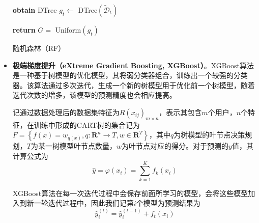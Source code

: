 \documentclass{MathorCupmodeling}
\begin{document}
\begin{itemize}
{\begin{algorithm}[H]
{			\textbf{obtain} DTree $g_t\leftarrow$ DTree$\left(\tilde{\mathcal{D}}_t\right)$\
	
			\textbf{return} $G=$ Uniform$\left(g_t\right)$
			}
			
			\caption{随机森林（RF）}
		\end{algorithm}}

		\item \textbf{极端梯度提升（eXtreme Gradient Boosting, XGBoost）}。XGBoost算法是一种基于树模型的优化模型，其将弱分类器组合，训练出一个较强的分类器。该算法通过多次迭代，生成一个新的树模型用于优化前一个树模型，随着迭代次数的增多，该模型的预测精度也会相应提高\textcolor{blue}{\cite{pxgboost1}}。

		记通过数据处理后的数据集特征为$R\left(x_{ij}\right)_{m\times n}$，表示其包含$m$个用户，$n$个特征，在训练中形成的CART树的集合记为$F=\left\{f\left(x\right)=w_{q\left(x\right)},q:\mathbf{R}^n\to T,w\in \mathbf{R}^T\right\}$，其中$q$为树模型的叶节点决策规划，$T$为某一树模型叶节点数量，$w$为叶节点对应的得分\textcolor{blue}{\cite{pxgboost2}}。对于预测的$y$值，其计算公式为
		\begin{equation}
			\hat{y}=\varphi \left( x_i \right) =\sum\limits_{k=1}^K{f_k\left( x_i \right)} \label{fXGBoostypre}
		\end{equation}
	
		XGBoost算法在每一次迭代过程中会保存前面所学习的模型，会将这些模型加入到新一轮迭代过程中，因此我们记第$i$个模型为预测结果为
		\begin{equation}
			\hat{y}_{i}^{\left(t\right)}=\hat{y}_{i}^{\left(t-1\right)}+f_t\left(x_i\right) \label{fXGBoostyprei}
		\end{equation}
		

\end{itemize}
\end{document}
